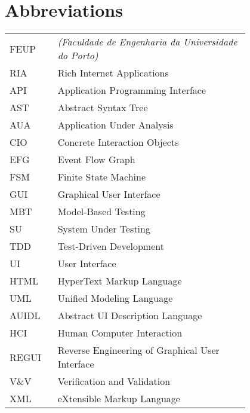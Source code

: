 \chapter*{Abbreviations}

\begin{flushleft}
\begin{tabular}{l p{0.8\linewidth}}
FEUP	& \Feup{} \textit{(Faculdade de Engenharia da Universidade do Porto)}\\
RIA	& Rich Internet Applications \\
API	& Application Programming Interface \\
AST	& Abstract Syntax Tree \\
AUA	& Application Under Analysis \\
CIO	& Concrete Interaction Objects \\
EFG	& Event Flow Graph \\
FSM	& Finite State Machine \\
GUI	& Graphical User Interface \\
MBT	& Model-Based Testing \\
SU	& System Under Testing \\
TDD	& Test-Driven Development \\
UI	& User Interface \\
HTML	& HyperText Markup Language \\
UML	& Unified Modeling Language \\
AUIDL	& Abstract UI Description Language \\
HCI	& Human Computer Interaction \\
REGUI	& Reverse Engineering of Graphical User Interface \\
V\&V	& Verification and Validation \\
XML	& eXtensible Markup Language \\
\end{tabular}
\end{flushleft}


